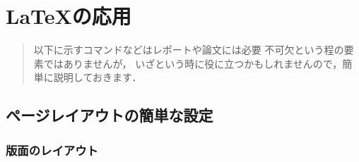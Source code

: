 \chapter{\texorpdfstring \LaTeX {LaTeX}の応用}

\begin{abstract}
以下に示すコマンドなどはレポートや論文には必要
不可欠という程の要素ではありませんが，%
いざという時に役に立つかもしれませんので，簡単に説明しておきます．
\end{abstract}


\section{ページレイアウトの簡単な設定}


\subsection{版面のレイアウト}

